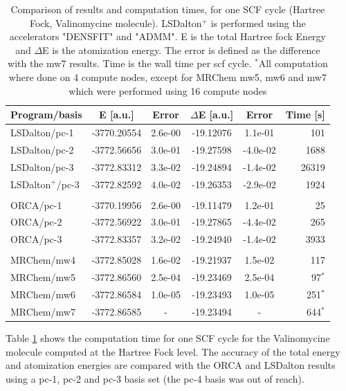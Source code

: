 \documentclass[%
 aip,
 amsmath,amssymb,
 reprint,%
]{revtex4-1}
\begin{document}
\begin{table}[t]
    \centering
    \caption{Comparison of results and computation times, for one SCF cycle (Hartree Fock, Valinomycine molecule). LSDalton$^+$ is performed using the accelerators "DENSFIT" and "ADMM". E is the total Hartree fock Energy and $\Delta$E is the atomization energy. The error is defined as the difference with the mw7 results. Time is the wall time per scf cycle. $^*$All computation where done on 4 compute nodes, except for MRChem mw5, mw6 and mw7 which were performed using 16 compute nodes}
    \begin{tabular}{l|cc|cc|r}
    \hline
    \hline
    Program/basis     & E [a.u.]   &Error &$\Delta$E [a.u.]& Error & Time [s]\\
    \hline
    LSDalton/pc-1     &-3770.20554 &2.6e-00 &-19.12076 &1.1e-01 &101     \\
    LSDalton/pc-2     &-3772.56656 &3.0e-01 &-19.27598 &-4.0e-02 &1688    \\
    LSDalton/pc-3     &-3772.83312 &3.3e-02 &-19.24894 &-1.4e-02 &26319   \\
    LSDalton$^+$/pc-3     &-3772.82592 &4.0e-02 &-19.26353 &-2.9e-02 &1924\\
                      &            &        &          &        &        \\
    ORCA/pc-1         &-3770.19956 &2.6e-00 &-19.11479 &1.2e-01 &25      \\
    ORCA/pc-2         &-3772.56922 &3.0e-01 &-19.27865 &-4.4e-02 &265     \\
    ORCA/pc-3         &-3772.83357 &3.2e-02 &-19.24940 &-1.4e-02 &3933    \\
                      &            &        &          &        &        \\
    MRChem/mw4        &-3772.85028 &1.6e-02 &-19.21937 &1.5e-02 &117     \\
    MRChem/mw5        &-3772.86560 &2.5e-04 &-19.23469 &2.5e-04 & 97$^*$ \\
    MRChem/mw6        &-3772.86584 &1.0e-05 &-19.23493 &1.0e-05 &251$^*$ \\
    MRChem/mw7        &-3772.86585 &-       &-19.23494 &-       &644$^*$ \\
    \hline
    \hline
    \end{tabular}    
        \label{tab:MRC_ORCA_LSD}
\end{table}

Table \ref{tab:MRC_ORCA_LSD} shows the computation time for one SCF cycle for the Valinomycine molecule computed at the Hartree Fock level. The accuracy of the total energy and atomization energies are compared with the ORCA and LSDalton
results using a pc-1, pc-2 and pc-3 basis set (the pc-4 basis was out of reach). 
\end{document}
